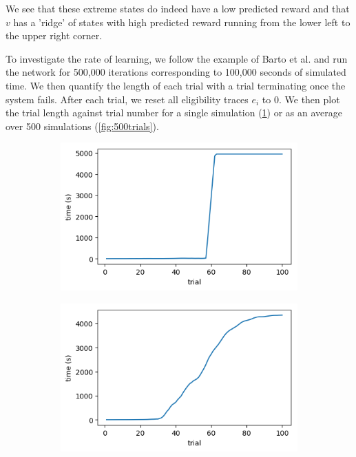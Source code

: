 \documentclass{article}
\begin{document}
We see that these extreme states do indeed have a low predicted reward and that $v$ has a 'ridge' of states with high predicted reward running from the lower left to the upper right corner.

To investigate the rate of learning, we follow the example of Barto et al. and run the network for 500,000 iterations corresponding to 100,000 seconds of simulated time. We then quantify the length of each trial with a trial terminating once the system fails. After each trial, we reset all eligibility traces $e_i$ to 0. We then plot the trial length against trial number for a single simulation (\ref{fig:singletrial}) or as an average over 500 simulations (\ref{fig:500trials}).

\begin{figure}[h]
	\centering
	\begin{subfigure}[t]{0.30\linewidth}
		\centering
		\includegraphics[width = 1.0\linewidth, trim={5 5 5 10}, clip=true]{figures/learn500000_performance.png}
		\label{fig:singletrial}	
	\end{subfigure}%
	\hspace{0.1\linewidth}
	\begin{subfigure}[t]{0.30\linewidth}
		\centering
		\includegraphics[width = 1.0\linewidth, trim={5 5 5 10}, clip=true]{figures/real_meanperformance.png}

\end{subfigure}
\end{figure}
\end{document}
